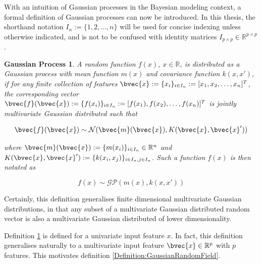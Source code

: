 			With an intuition of Gaussian processes in the Bayesian modeling context, a formal definition of Gaussian processes can now be introduced. In this thesis, the shorthand notation $I_{n} := \{1, 2, \dots, n\}$ will be used for concise indexing unless otherwise indicated, and is not to be confused with identity matrices $I_{p \times p} \in \mathbb{R}^{p \times p}$.
			
			\newpage
			\newtheorem{gpdef}{Gaussian Process}[section]
			\begin{gpdef}
				A random function $f(x)$, $x \in \mathbb{R}$, is distributed as a Gaussian process with mean function $m(x)$ and covariance function $k(x, x')$, if for any finite collection of features $\bvec{x} := \{x_{i}\}_{i \in I_{n}} := [x_{1}, x_{2}, \dots, x_{n}]^{T}$, the corresponding vector $\bvec{f}(\bvec{x}) := \{f(x_{i})\}_{i \in I_{n}} := [f(x_{1}), f(x_{2}), \dots, f(x_{n})]^{T}$ is jointly multivariate Gaussian distributed such that 

					\begin{equation}
						\bvec{f}(\bvec{x}) \sim \mathcal{N}(\bvec{m}(\bvec{x}), K(\bvec{x}, \bvec{x}'))
					\label{Equation:GaussianProcessFiniteDistribution}
					\end{equation}	
				
				where $\bvec{m}(\bvec{x}) :=  \{m(x_{i})\}_{i \in I_{n}} \in \mathbb{R}^{n}$ and $K(\bvec{x}, \bvec{x}') := \{k(x_{i}, x_{j})\}_{i \in I_{n}, j \in I_{n}}$. Such a function $f(x)$ is then notated as
				
					\begin{equation}
						f(x) \sim \mathcal{GP}(m(x), k(x, x'))
					\label{Equation:GaussianProcess}
					\end{equation}	
					
			\label{Definition:GaussianProcess}
			\end{gpdef}
			
			Certainly, this definition generalises finite dimensional multivariate Gaussian distributions, in that any subset of a multivariate Gaussian distributed random vector is also a multivariate Gaussian distributed of lower dimensionality.

			Definition \ref{Definition:GaussianProcess} is defined for a univariate input feature $x$. In fact, this definition generalises naturally to a multivariate input feature $\bvec{x} \in \mathbb{R}^{p}$ with $p$ features. This motivates definition \ref{Definition:GaussianRandomField}.
			
